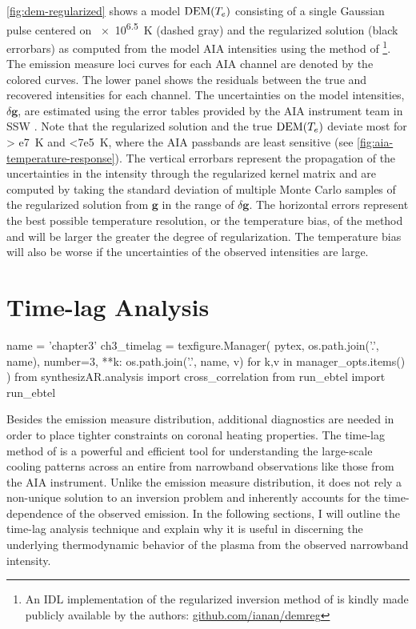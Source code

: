\autoref{fig:dem-regularized} shows a model $\textup{DEM}(T_e)$ consisting of a single Gaussian pulse centered on \SI{e6.5}{\kelvin} (dashed gray) and the  regularized solution (black errorbars) as computed from the model AIA intensities using the method of \citet{hannah_differential_2012}\footnote{An  IDL implementation of the regularized inversion method of \citet{hannah_differential_2012} is kindly made publicly available by the authors: \href{https://github.com/ianan/demreg}{github.com/ianan/demreg}}. The emission measure loci curves for each AIA channel are denoted by the colored curves. The lower panel shows the residuals between the true and recovered intensities for each channel. The uncertainties on the model intensities, $\delta\mathbf{g}$, are estimated using the error tables provided by the AIA instrument team in SSW \citep{freeland_data_1998}. Note that the regularized solution and the true $\textup{DEM}(T_e)$ deviate most for \SI{> e7}{\kelvin} and \SI{<7e5}{\kelvin}, where the AIA passbands are least sensitive (see \autoref{fig:aia-temperature-response}). The vertical errorbars represent the propagation of the uncertainties in the intensity through the regularized kernel matrix and are computed by taking the standard deviation of multiple Monte Carlo samples of the regularized solution from $\mathbf{g}$ in the range of $\delta\mathbf{g}$. The horizontal errors represent the best possible temperature resolution, or the temperature bias, of the method and will be larger the greater the degree of regularization. The temperature bias will also be worse if the uncertainties of the observed intensities are large.

\section{Time-lag Analysis}\label{sec:timelag}

\begin{pycode}
name = 'chapter3'
ch3_timelag = texfigure.Manager(
    pytex,
    os.path.join('.', name),
    number=3,
    **{k: os.path.join('.', name, v) for k,v in manager_opts.items()}
)
from synthesizAR.analysis import cross_correlation
from run_ebtel import run_ebtel
\end{pycode}

Besides the emission measure distribution, additional diagnostics are needed in order to place tighter constraints on coronal heating properties. The time-lag method of \citet{viall_evidence_2012} is a powerful and efficient tool for understanding the large-scale cooling patterns across an entire \AR{} from narrowband observations like those from the AIA instrument. Unlike the emission measure distribution, it does not rely a non-unique solution to an inversion problem and inherently accounts for the time-dependence of the observed emission. In the following sections, I will outline the time-lag analysis technique and explain why it is useful in discerning the underlying thermodynamic behavior of the plasma from the observed narrowband intensity. 

